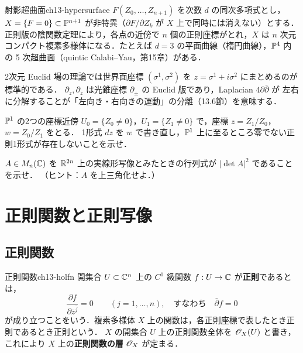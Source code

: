 \begin{myex}{射影超曲面}{ch13-hypersurface}
$F(Z_0,\dots,Z_{n+1})$ を次数 $d$ の同次多項式とし，$X=\{F=0\}\subset\mathbb{P}^{n+1}$ が非特異（$\partial F/\partial Z_k$ が
$X$ 上で同時には消えない）とする．正則版の陰関数定理により，各点の近傍で $n$ 個の正則座標がとれ，$X$ は $n$ 次元
コンパクト複素多様体になる．たとえば $d=3$ の平面曲線（楕円曲線），$\mathbb{P}^4$ 内の 5 次超曲面（quintic Calabi--Yau，第15章）がある．
\end{myex}

\begin{physbox}[複素座標と場の理論]
2次元 Euclid 場の理論では世界面座標 $(\sigma^1,\sigma^2)$ を $z=\sigma^1+i\sigma^2$ にまとめるのが標準的である．
$\partial_z,\partial_{\bar z}$ は光錐座標 $\partial_\pm$ の Euclid 版であり，Laplacian $4\partial\bar\partial$ が
左右に分解することが「左向き・右向きの運動」の分離（13.6節）を意味する．
\end{physbox}

$\mathbb{P}^1$ の2つの座標近傍 $U_0=\{Z_0\neq0\}$，$U_1=\{Z_1\neq0\}$ で，座標 $z=Z_1/Z_0$，$w=Z_0/Z_1$ をとる．
1形式 $dz$ を $w$ で書き直し，$\mathbb{P}^1$ 上に至るところ零でない正則1形式が存在しないことを示せ．

$A\in M_n(\mathbb{C})$ を $\mathbb{R}^{2n}$ 上の実線形写像とみたときの行列式が $|\det A|^2$ であることを示せ．
（ヒント：$A$ を上三角化せよ．）

\section{正則関数と正則写像}

\subsection{正則関数}

\begin{mydef}{正則関数}{ch13-holfn}
開集合 $U\subset\mathbb{C}^n$ 上の $C^1$ 級関数 $f:U\to\mathbb{C}$ が\textbf{正則}であるとは，
\begin{equation}
  \frac{\partial f}{\partial \bar z^{\bar j}} = 0\qquad (j=1,\dots,n),\quad\text{すなわち}\quad \bar\partial f=0
  \label{eq:ch13-cr}
\end{equation}
が成り立つことをいう．複素多様体 $X$ 上の関数は，各正則座標で表したとき正則であるとき正則という．
$X$ の開集合 $U$ 上の正則関数全体を $\mathscr{O}_X(U)$ と書き，これにより $X$ 上の\textbf{正則関数の層} $\mathscr{O}_X$ が定まる．
\end{mydef}

